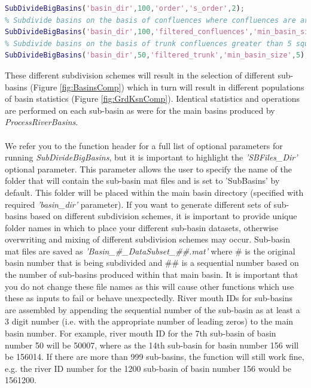\begin{lstlisting}[language=Matlab]
% Subdivide basins stored in the 'basin_dir' folder that are greater than 100 square kilometers in drainage  on the basis of stream order with outlets of second order streams serving as river mouths
SubDivideBigBasins('basin_dir',100,'order','s_order',2);
% Subdivide basins on the basis of confluences where confluences are areas with draiange areas greater than 5 square kilometers in drainage area
SubDivideBigBasins('basin_dir',100,'filtered_confluences','min_basin_size',5);
% Subdivide basins on the basis of trunk confluences greater than 5 square kilometers for any main basin greater than 50 square kilometers
SubDivideBigBasins('basin_dir',50,'filtered_trunk','min_basin_size',5);
\end{lstlisting}

\noindent
These different subdivision schemes will result in the selection of different sub-basins (Figure \ref{fig:BasinsComp}) which in turn will result in different populations of basin statistics (Figure \ref{fig:GrdKsnComp}). Identical statistics and operations are performed on each sub-basin as were for the main basins produced by \textit{ProcessRiverBasins}.

\paragraph{}We refer you to the function header for a full list of optional parameters for running \textit{SubDivideBigBasins}, but it is important to highlight the \textit{'SBFiles\_Dir'} optional parameter. This parameter allows the user to specify the name of the folder that will contain the sub-basin mat files and is set to 'SubBasins' by default. This folder will be placed within the main basin directory (specified with required \textit{'basin\_dir'} parameter). If you want to generate different sets of sub-basins based on different subdivision schemes, it is important to provide unique folder names in which to place your different sub-basin datasets, otherwise overwriting and mixing of different subdivision schemes may occur. Sub-basin mat files are saved as \textit{'Basin\_\#\_DataSubset\_\#\#.mat'} where \# is the original basin number that is being subdivided and \#\# is a sequential number based on the number of sub-basins produced within that main basin. It is important that you do not change these file names as this will cause other functions which use these as inputs to fail or behave unexpectedly. River mouth IDs for sub-basins are assembled by appending the sequential number of the sub-basin as at least a 3 digit number (i.e. with the appropriate number of leading zeros) to the main basin number. For example, river mouth ID for the 7th sub-basin of basin number 50 will be 50007, where as the 14th sub-basin for basin number 156 will be 156014. If there are more than 999 sub-basins, the function will still work fine, e.g. the river ID number for the 1200 sub-basin of basin number 156 would be 1561200.

